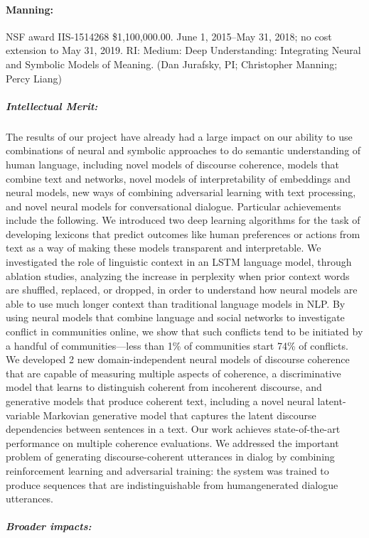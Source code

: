 \documentclass{article}
\begin{document}
\paragraph{Manning:} NSF award IIS-1514268 \$1,100,000.00. June 1, 2015--May 31, 2018; no cost extension to May 31, 2019. RI: Medium: Deep Understanding: Integrating Neural and Symbolic Models of Meaning. (Dan Jurafsky, PI; Christopher Manning; Percy Liang)

\subparagraph{Intellectual Merit:} The results of our project have already had a large impact on our ability to use combinations of neural and symbolic approaches to do semantic understanding of human language, including novel models of discourse coherence, models that combine text and networks, novel models of interpretability of embeddings and neural models, new ways of combining adversarial learning with text processing, and novel neural models for conversational dialogue. Particular achievements include the following. We introduced two deep learning algorithms for the task of developing lexicons that predict outcomes like human preferences or actions from text as a way of making these models transparent and interpretable. We investigated the role of linguistic context in an LSTM language model, through ablation studies, analyzing the increase in perplexity when prior context words are shuffled, replaced, or dropped, in order to understand how neural models are able to use much longer context than traditional language models in NLP\@. By using neural models that combine language and social networks to investigate conflict in communities online, we show that such conflicts tend to be initiated by a handful of communities---less than 1\% of communities start 74\% of conflicts. We developed 2 new domain-independent neural models of discourse coherence that are capable of measuring multiple aspects of coherence, a discriminative model that learns to distinguish coherent from incoherent discourse, and generative models that produce coherent text, including a novel neural latent-variable Markovian generative model that captures the latent discourse dependencies between sentences in a text. Our work achieves state-of-the-art performance on multiple coherence evaluations. We addressed the important problem of generating discourse-coherent utterances in dialog by combining reinforcement learning and adversarial training: the system was trained to produce sequences that are indistinguishable from humangenerated dialogue utterances.

\subparagraph{Broader impacts:} 
\end{document}
